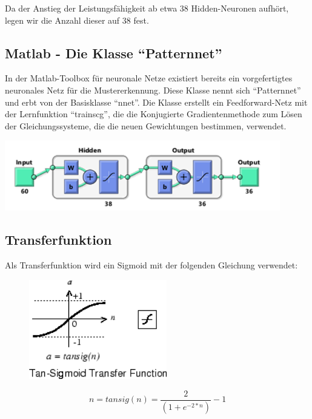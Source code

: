 Da der Anstieg der Leistungsfähigkeit ab etwa $38$ Hidden-Neuronen aufhört,
legen wir die Anzahl dieser auf $38$ fest.

\subsection{Matlab - Die Klasse ``Patternnet''}

In der Matlab-Toolbox für neuronale Netze existiert bereits ein vorgefertigtes
neuronales Netz für die Mustererkennung. Diese Klasse nennt sich ``Patternnet''
und erbt von der Basisklasse ``nnet''. Die Klasse erstellt ein Feedforward-Netz
mit der Lernfunktion ``trainscg'', die die Konjugierte Gradientenmethode zum
Lösen der Gleichungssysteme, die die neuen Gewichtungen bestimmen, verwendet.


  \begin{center}
    \includegraphics[width=12cm]{res/PatternNet-Aufbau.png}
  \end{center}


\subsection{Transferfunktion}
 Als Transferfunktion wird ein Sigmoid mit der folgenden Gleichung verwendet:

\begin{figure}
  \begin{center}
    \includegraphics[width=6cm]{res/tansig.png}
  \end{center}
\end{figure}

\begin{equation}
n = tansig(n) =  \frac{2}{(1 + e^{-2*n})} - 1
\end{equation}

